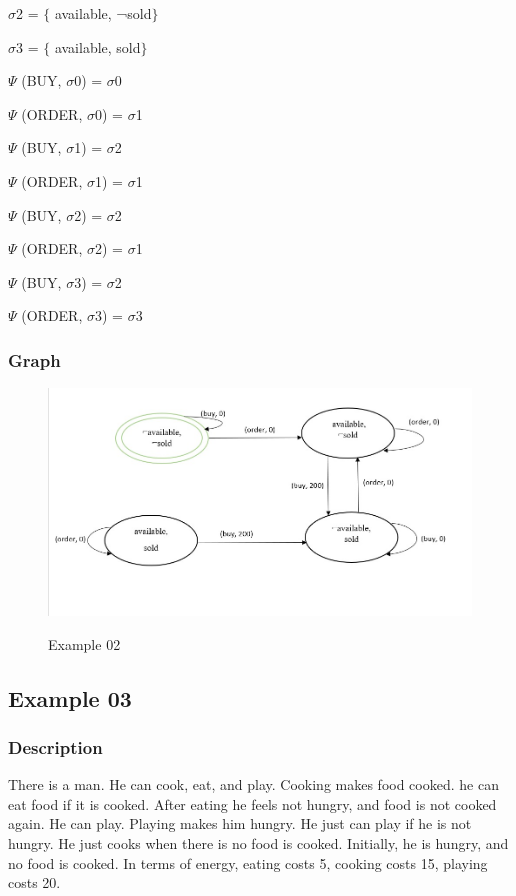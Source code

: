 \documentclass[11pt]{article}
\begin{document}
	$ \sigma $2 = $ \{ $ available, ¬sold$ \} $ \par
	
	$ \sigma $3 = $ \{ $ available, sold$ \} $ \par
	\(  \Psi  \)  (BUY, $ \sigma $0) = $ \sigma $0\par
	
	\(  \Psi  \)  (ORDER, $ \sigma $0) = $ \sigma $1\par
	
	\(  \Psi  \)  (BUY, $ \sigma $1) = $ \sigma $2\par
	
	\(  \Psi  \)  (ORDER, $ \sigma $1) = $ \sigma $1\par
	
	\(  \Psi  \)  (BUY, $ \sigma $2) = $ \sigma $2\par
	
	\(  \Psi  \)  (ORDER, $ \sigma $2) = $ \sigma $1\par
	
	\(  \Psi  \)  (BUY, $ \sigma $3) = $ \sigma $2\par
	
	\(  \Psi  \)  (ORDER, $ \sigma $3) = $ \sigma $3\par
	\subsubsection{Graph}\label{par:p402}
	\begin{figure}[H]
		\includegraphics[width=1\linewidth, height=0.3\textheight]{./media/image1.jpeg}
		\label{Figure:f02}
		\caption{Example 02}
	\end{figure}
	\subsection{Example 03}
	\subsubsection{Description}\label{par:p103}
	There is a man. He can cook, eat, and play. Cooking makes food cooked. he can eat food if it is cooked. After eating he feels not hungry, and food is not cooked again. He can play. Playing makes him hungry. He just can play if he is not hungry. He just cooks when there is no food is cooked. Initially, he is hungry, and no food is cooked. In terms of energy, eating costs 5, cooking costs 15, playing costs 20.\\
	\\
\end{document}
